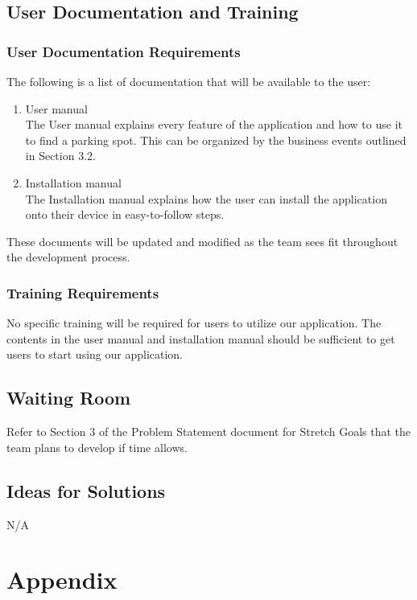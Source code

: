\documentclass[12pt,letterpaper]{article}
\begin{document}
\subsection{User Documentation and Training}

\subsubsection{User Documentation Requirements}
The following is a list of documentation that will be available to the user:
\begin{enumerate}
    \item User manual \\
    The User manual explains every feature of the application and how to use it
    to find a parking spot. This can be organized by the business events
    outlined in Section 3.2. 
    \item Installation manual \\
    The Installation manual explains how the user can install the application
    onto their device in easy-to-follow steps.
\end{enumerate}
These documents will be updated and modified as the team sees fit throughout the
development process. 
\subsubsection{Training Requirements}
No specific training will be required for users to utilize our application. The
contents in the user manual and installation manual should be sufficient to get
users to start using our application.
\subsection{Waiting Room}
Refer to Section 3 of the Problem Statement document for Stretch Goals that the
team plans to develop if time allows.
\subsection{Ideas for Solutions}
N/A

\newpage
\section{Appendix}
\label{appendix}
\end{document}
